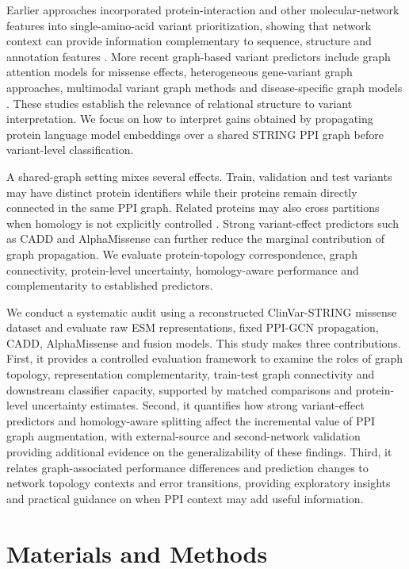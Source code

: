 \documentclass[conference]{IEEEtran}
\begin{document}
Earlier approaches incorporated protein-interaction and other molecular-network features into single-amino-acid variant prioritization, showing that network context can provide information complementary to sequence, structure and annotation features \cite{Yates2014SuSPect,Ozturk2022NetworkFeatures}. More recent graph-based variant predictors include graph attention models for missense effects, heterogeneous gene-variant graph approaches, multimodal variant graph methods and disease-specific graph models \cite{Zhang2022gMVP,Cheng2021VEGN,Yu2025GNNMAP,Ghadie2025DiseaseSpecificGNN}. These studies establish the relevance of relational structure to variant interpretation. We focus on how to interpret gains obtained by propagating protein language model embeddings over a shared STRING PPI graph before variant-level classification.

A shared-graph setting mixes several effects. Train, validation and test variants may have distinct protein identifiers while their proteins remain directly connected in the same PPI graph. Related proteins may also cross partitions when homology is not explicitly controlled \cite{Littmann2022ProteinMLTips,Teufel2023GraphPart}. Strong variant-effect predictors such as CADD and AlphaMissense can further reduce the marginal contribution of graph propagation. We evaluate protein-topology correspondence, graph connectivity, protein-level uncertainty, homology-aware performance and complementarity to established predictors.

We conduct a systematic audit using a reconstructed ClinVar-STRING missense dataset and evaluate raw ESM representations, fixed PPI-GCN propagation, CADD, AlphaMissense and fusion models. This study makes three contributions. First, it provides a controlled evaluation framework to examine the roles of graph topology, representation complementarity, train-test graph connectivity and downstream classifier capacity, supported by matched comparisons and protein-level uncertainty estimates. Second, it quantifies how strong variant-effect predictors and homology-aware splitting affect the incremental value of PPI graph augmentation, with external-source and second-network validation providing additional evidence on the generalizability of these findings. Third, it relates graph-associated performance differences and prediction changes to network topology contexts and error transitions, providing exploratory insights and practical guidance on when PPI context may add useful information.

\section{Materials and Methods}
\end{document}
